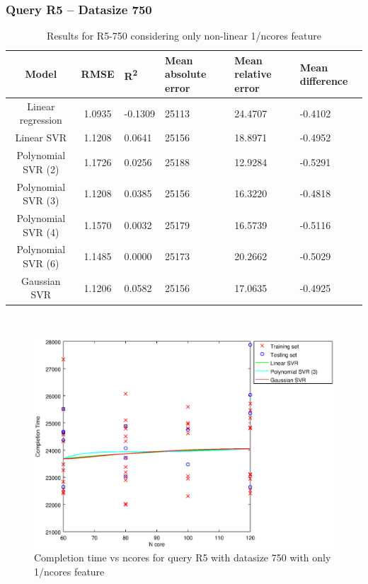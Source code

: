 \documentclass[a4paper,11pt]{article}
\begin{document}
\newpage
\subsubsection{Query R5 -- Datasize 750}
\begin{table}[H]
	\centering
	\begin{adjustbox}{center}
		\begin{tabular}{c | c M{1.2cm} M{2.5cm} M{2.5cm} M{1.8cm}}
			Model & RMSE & R\textsuperscript{2} & Mean absolute error & Mean relative error & Mean difference \tabularnewline
			\hline
			Linear regression & 1.0935 & -0.1309 &  25113 & 24.4707 & -0.4102 \\
			Linear SVR & 1.1208 & 0.0641 &  25156 & 18.8971 & -0.4952 \\
			Polynomial SVR (2) & 1.1726 & 0.0256 &  25188 & 12.9284 & -0.5291 \\
			Polynomial SVR (3) & 1.1208 & 0.0385 &  25156 & 16.3220 & -0.4818 \\
			Polynomial SVR (4) & 1.1570 & 0.0032 &  25179 & 16.5739 & -0.5116 \\
			Polynomial SVR (6) & 1.1485 & 0.0000 &  25173 & 20.2662 & -0.5029 \\
			Gaussian SVR & 1.1206 & 0.0582 &  25156 & 17.0635 & -0.4925 \\
		\end{tabular}
	\end{adjustbox}
	\\
	\caption{Results for R5-750 considering only non-linear 1/ncores feature}
	\label{table_R5_prediction_all}
\end{table}

\begin {figure}[hbtp]
\centering
\includegraphics[width=\textwidth]{output/R5_750_ONLY_1_OVER_NCORES/plot_R5_750_bestmodels.eps}
\caption {Completion time vs ncores for query R5 with datasize 750 with only 1/ncores feature}
\end {figure}
\end{document}

